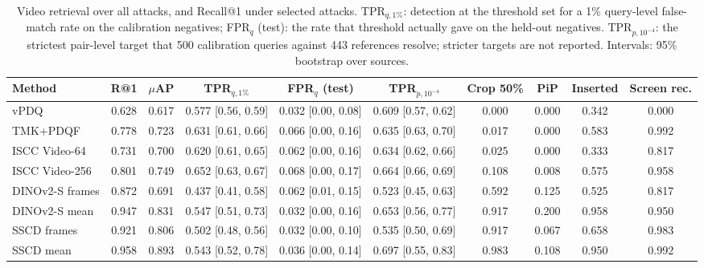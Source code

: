 \begin{table}[!t]
\centering
\scriptsize
\caption{Video retrieval over all attacks, and Recall@1 under selected attacks. TPR$_{q,1\%}$: detection at the threshold set for a 1\% query-level false-match rate on the calibration negatives; FPR$_q$ (test): the rate that threshold actually gave on the held-out negatives. TPR$_{p,10^{-4}}$: the strictest pair-level target that 500 calibration queries against 443 references resolve; stricter targets are not reported. Intervals: 95\% bootstrap over sources.}
\label{tab:fp-video}
\setlength{\tabcolsep}{3pt}
\begin{tabular}{lccccccccc}
\toprule
Method & R@1 & $\mu$AP & TPR$_{q,1\%}$ & FPR$_{q}$ (test) & TPR$_{p,10^{-4}}$ & Crop 50\% & PiP & Inserted & Screen rec. \\
\midrule
vPDQ & 0.628 & 0.617 & 0.577 \tiny[0.56, 0.59] & 0.032 \tiny[0.00, 0.08] & 0.609 \tiny[0.57, 0.62] & 0.000 & 0.000 & 0.342 & 0.000 \\
TMK+PDQF & 0.778 & 0.723 & 0.631 \tiny[0.61, 0.66] & 0.066 \tiny[0.00, 0.16] & 0.635 \tiny[0.63, 0.70] & 0.017 & 0.000 & 0.583 & 0.992 \\
ISCC Video-64 & 0.731 & 0.700 & 0.620 \tiny[0.61, 0.65] & 0.062 \tiny[0.00, 0.16] & 0.634 \tiny[0.62, 0.66] & 0.025 & 0.000 & 0.333 & 0.817 \\
ISCC Video-256 & 0.801 & 0.749 & 0.652 \tiny[0.63, 0.67] & 0.068 \tiny[0.00, 0.17] & 0.664 \tiny[0.66, 0.69] & 0.108 & 0.008 & 0.575 & 0.958 \\
DINOv2-S frames & 0.872 & 0.691 & 0.437 \tiny[0.41, 0.58] & 0.062 \tiny[0.01, 0.15] & 0.523 \tiny[0.45, 0.63] & 0.592 & 0.125 & 0.525 & 0.817 \\
DINOv2-S mean & 0.947 & 0.831 & 0.547 \tiny[0.51, 0.73] & 0.032 \tiny[0.00, 0.16] & 0.653 \tiny[0.56, 0.77] & 0.917 & 0.200 & 0.958 & 0.950 \\
SSCD frames & 0.921 & 0.806 & 0.502 \tiny[0.48, 0.56] & 0.032 \tiny[0.00, 0.10] & 0.535 \tiny[0.50, 0.69] & 0.917 & 0.067 & 0.658 & 0.983 \\
SSCD mean & 0.958 & 0.893 & 0.543 \tiny[0.52, 0.78] & 0.036 \tiny[0.00, 0.14] & 0.697 \tiny[0.55, 0.83] & 0.983 & 0.108 & 0.950 & 0.992 \\
\bottomrule
\end{tabular}

\end{table}
